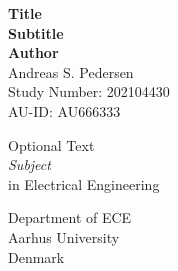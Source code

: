 \documentclass[../main.tex]{subfiles}
\begin{document}
\thispagestyle{empty}

\begin{titlepage}
    \begin{center}
        \vspace*{20pt}
        \textbf{\Huge{Title}} \\
        \vspace*{20pt}
        \textbf{\large{Subtitle}} \\
        \vspace*{50pt}
        \textbf{\Large{Author}} \\
        Andreas S. Pedersen     \\
        Study Number: 202104430 \\
        AU-ID: AU666333         \\

        \vfill

        Optional Text\\
        \textit{Subject} \\
        in Electrical Engineering \\

        \vspace{0.8cm}

        \vspace*{1cm}

        Department of ECE\\
        Aarhus University\\
        Denmark
    \end{center}
\end{titlepage}
\end{document}
